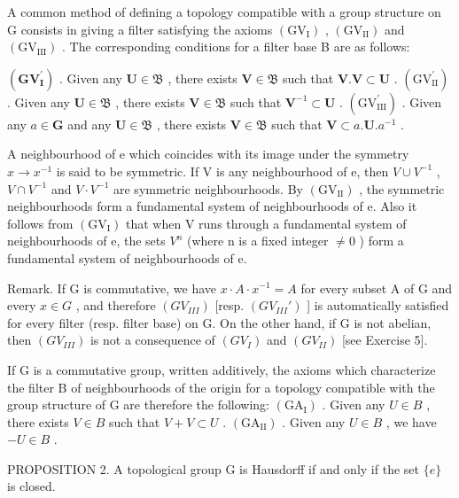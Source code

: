 A common method of defining a topology compatible with a group structure on G consists in giving a filter satisfying the axioms \((\mathrm{GV}_{\mathrm{I}})\) , \((\mathrm{GV}_{\mathrm{II}})\) and \((\mathrm{GV}_{\mathrm{III}})\) . The corresponding conditions for a filter base B are as follows:

\((\mathbf{GV}_{\mathbf{I}}^{\prime})\) . Given any \(\mathbf{U}\in \mathfrak{B}\) , there exists \(\mathbf{V}\in \mathfrak{B}\) such that \(\mathbf{V}.\mathbf{V}\subset \mathbf{U}\) . \((\mathrm{GV}_{\mathrm{II}}^{\prime})\) . Given any \(\mathbf{U} \in \mathfrak{B}\) , there exists \(\mathbf{V} \in \mathfrak{B}\) such that \(\mathbf{V}^{-1} \subset \mathbf{U}\) . \((\mathrm{GV}_{\mathrm{III}}^{\prime})\) . Given any \(a \in \mathbf{G}\) and any \(\mathbf{U} \in \mathfrak{B}\) , there exists \(\mathbf{V} \in \mathfrak{B}\) such that \(\mathbf{V} \subset a. \mathbf{U}. a^{-1}\) .

A neighbourhood of e which coincides with its image under the symmetry \(x \rightarrow x^{-1}\) is said to be symmetric. If V is any neighbourhood of e, then \(V \cup V^{-1}\) , \(V \cap V^{-1}\) and \(V \cdot V^{-1}\) are symmetric neighbourhoods. By \((\mathrm{GV}_{\mathrm{II}})\) , the symmetric neighbourhoods form a fundamental system of neighbourhoods of e. Also it follows from \((\mathrm{GV}_{\mathrm{I}})\) that when V runs through a fundamental system of neighbourhoods of e, the sets \(V^{n}\) (where n is a fixed integer \(\neq 0\) ) form a fundamental system of neighbourhoods of e.

Remark. If G is commutative, we have \(x \cdot A \cdot x^{-1} = A\) for every subset A of G and every \(x \in G\) , and therefore \((GV_{III})\) {[}resp. \((GV_{III}')\) {]} is automatically satisfied for every filter (resp. filter base) on G. On the other hand, if G is not abelian, then \((GV_{III})\) is not a consequence of \((GV_I)\) and \((GV_{II})\) {[}see Exercise 5{]}.

If G is a commutative group, written additively, the axioms which characterize the filter B of neighbourhoods of the origin for a topology compatible with the group structure of G are therefore the following: \((\mathrm{GA}_{\mathrm{I}})\) . Given any \(U \in B\) , there exists \(V \in B\) such that \(V + V \subset U\) . \((\mathrm{GA}_{\mathrm{II}})\) . Given any \(U \in B\) , we have \(-U \in B\) .

PROPOSITION 2. A topological group G is Hausdorff if and only if the set \(\{e\}\) is closed.

